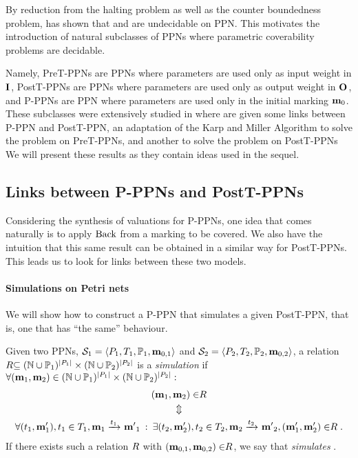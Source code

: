 By reduction from the halting problem as well as the counter boundedness problem, \cite{David17} has shown that \Ucov and \Ecov are undecidable on \ac{PPN}.
This motivates the introduction of natural subclasses of \acp{PPN} where parametric coverability problems are decidable.

Namely,
PreT-PPNs are \acp{PPN} where parameters are used only as input weight in $\inm$,
PostT-PPNs are \acp{PPN} where parameters are used only as output weight in $\outm$,
and P-PPNs are \ac{PPN} where parameters are used only in the initial marking $\mathbf{m}_0$.
These subclasses were extensively studied in \cite{David17} where are given
some links between P-PPN and PostT-PPN,
an adaptation of the Karp and Miller Algorithm to solve the \Ucov problem on PreT-\acp{PPN},
and another to solve the \Ecov problem on PostT-\acp{PPN}%
We will present these results as they contain ideas used in the sequel.

\subsection{Links between P-PPNs and PostT-PPNs}
\label{sec:p-ppn-and-postt-ppn}

Considering the synthesis of valuations for P-PPNs, one idea that comes naturally is to apply $\operatorname{Back}$ from a marking to be covered.
We also have the intuition that this same result can be obtained in a similar way for PostT-PPNs. 
This leads us to look for links between these two models.

\paragraph{Simulations on Petri nets}
\label{sec:postt-ppn-to-p-ppn}

We will show how to construct a P-PPN that simulates a given PostT-PPN, that is, one that has ``the same'' behaviour.

\begin{defi}
  Given two \acp{PPN}, $\defPPN[1]$ and $\defPPN[2]$, a relation $\mathrel{R} \subseteq (\mathbb{N} \cup  \mathbb{P}_1)^{\left|P_1\right|} \times (\mathbb{N} \cup  \mathbb{P}_2)^{\left|P_2\right|}$ is a \emph{simulation} if $\forall (\mathbf{m}_1, \mathbf{m}_2) \in (\mathbb{N} \cup  \mathbb{P}_1)^{\left|P_1\right|} \times (\mathbb{N} \cup  \mathbb{P}_2)^{\left|P_2\right|} : $
  \begin{gather*}
    (\mathbf{m}_1, \mathbf{m}_2) \in \mathrel{R} \\
    \Updownarrow\\
    \forall (t_1,\mathbf{m}'_1), t_1 \in T_1, \mathbf{m}_1 \xrightarrow{t_1}_{} \mathbf{m'}_1 \>:\>
    \exists (t_2,\mathbf{m}'_2), t_2 \in T_2, \mathbf{m}_2 \xrightarrow{t_2}_{} \mathbf{m'}_2, (\mathbf{m}'_1, \mathbf{m}'_2) \in \mathrel{R}.
  \end{gather*}
  If there exists such a relation $\mathrel{R}$ with $(\mathbf{m}_{0,1}, \mathbf{m}_{0,2}) \in \mathrel{R}$, we say that \namePPN[2] \emph{simulates} \namePPN[1].
\end{defi}

